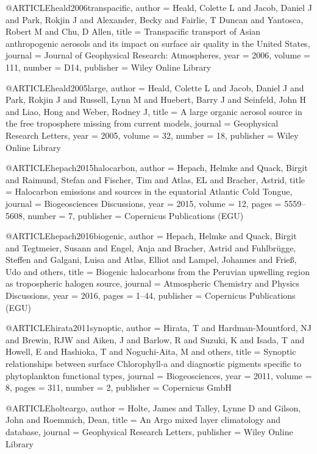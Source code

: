@ARTICLE{heald2006transpacific,
  author = {Heald, Colette L and Jacob, Daniel J and Park, Rokjin J and Alexander,
	Becky and Fairlie, T Duncan and Yantosca, Robert M and Chu, D Allen},
  title = {Transpacific transport of Asian anthropogenic aerosols and its impact
	on surface air quality in the United States},
  journal = {Journal of Geophysical Research: Atmospheres},
  year = {2006},
  volume = {111},
  number = {D14},
  publisher = {Wiley Online Library}
}

@ARTICLE{heald2005large,
  author = {Heald, Colette L and Jacob, Daniel J and Park, Rokjin J and Russell,
	Lynn M and Huebert, Barry J and Seinfeld, John H and Liao, Hong and
	Weber, Rodney J},
  title = {A large organic aerosol source in the free troposphere missing from
	current models},
  journal = {Geophysical Research Letters},
  year = {2005},
  volume = {32},
  number = {18},
  publisher = {Wiley Online Library}
}

@ARTICLE{hepach2015halocarbon,
  author = {Hepach, Helmke and Quack, Birgit and Raimund, Stefan and Fischer,
	Tim and Atlas, EL and Bracher, Astrid},
  title = {Halocarbon emissions and sources in the equatorial Atlantic Cold
	Tongue},
  journal = {Biogeosciences Discussions},
  year = {2015},
  volume = {12},
  pages = {5559--5608},
  number = {7},
  publisher = {Copernicus Publications (EGU)}
}

@ARTICLE{hepach2016biogenic,
  author = {Hepach, Helmke and Quack, Birgit and Tegtmeier, Susann and Engel,
	Anja and Bracher, Astrid and Fuhlbr{\"u}gge, Steffen and Galgani,
	Luisa and Atlas, Elliot and Lampel, Johannes and Frie{\ss}, Udo and
	others},
  title = {Biogenic halocarbons from the Peruvian upwelling region as tropospheric
	halogen source},
  journal = {Atmospheric Chemistry and Physics Discussions},
  year = {2016},
  pages = {1--44},
  publisher = {Copernicus Publications (EGU)}
}

@ARTICLE{hirata2011synoptic,
  author = {Hirata, T and Hardman-Mountford, NJ and Brewin, RJW and Aiken, J
	and Barlow, R and Suzuki, K and Isada, T and Howell, E and Hashioka,
	T and Noguchi-Aita, M and others},
  title = {Synoptic relationships between surface Chlorophyll-a and diagnostic
	pigments specific to phytoplankton functional types},
  journal = {Biogeosciences},
  year = {2011},
  volume = {8},
  pages = {311},
  number = {2},
  publisher = {Copernicus GmbH}
}

@ARTICLE{holteargo,
  author = {Holte, James and Talley, Lynne D and Gilson, John and Roemmich, Dean},
  title = {An Argo mixed layer climatology and database},
  journal = {Geophysical Research Letters},
  publisher = {Wiley Online Library}
}

